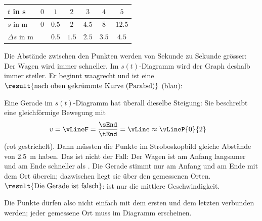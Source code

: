 \begin{abcliste}
\abc
\begin{center}
\begin{tabular}{l|cccccc}
$t$ in \si{\second} & $0$ & $1$ & $2$ & $3$ & $4$ & $5$ \\
\hline
$s$ in \si{\meter} & $0$ & $0.5$ & $2$ & $4.5$ & $8$ & $12.5$ \\
\hline
$\Delta s$ in \si{\meter} & & $0.5$ & $1.5$ & $2.5$ & $3.5$ & $4.5$
\end{tabular}
\end{center}
Die Abstände zwischen den Punkten werden von Sekunde zu Sekunde grösser: Der Wagen wird immer schneller. Im $s(t)$-Diagramm wird der Graph deshalb immer steiler. Er beginnt waagrecht und ist eine $\result{\text{nach oben gekrümmte Kurve (Parabel)}}$ (blau):
\begin{center}
\end{center}
\abc Eine Gerade im $s(t)$-Diagramm hat überall dieselbe Steigung: Sie beschreibt eine gleichförmige Bewegung mit
\begin{align}
 v &= \vLineF = \frac{\sEnd}{\tEnd} = \vLine \approx \vLineP{0}{2}
\end{align}
(rot gestrichelt). Dann müssten die Punkte im Stroboskopbild gleiche Abstände von \SI{2.5}{\meter} haben. Das ist nicht der Fall: Der Wagen ist am Anfang langsamer und am Ende schneller als . Die Gerade stimmt nur am Anfang und am Ende mit dem Ort überein; dazwischen liegt sie über den gemessenen Orten. $\result{\text{Die Gerade ist falsch}}$:  ist nur die mittlere Geschwindigkeit.

Die Punkte dürfen also nicht einfach mit dem ersten und dem letzten verbunden werden; jeder gemessene Ort muss im Diagramm erscheinen.
\end{abcliste}

